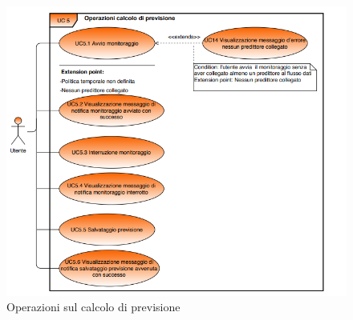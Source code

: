 	\begin{figure}[H]
		\centering
		\includegraphics[scale=0.70]{../Analisi_dei_requisiti/img/Diagrammi_UML/UC5_Operazioni_calcolo_di_previsione.png}
		\caption{Operazioni sul calcolo di previsione}
	\end{figure}	

